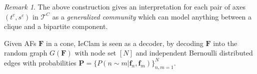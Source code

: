 \documentclass{article}
\theoremstyle{plain}
\theoremstyle{definition}
\theoremstyle{remark}
\newtheorem{remark}[theorem]{Remark}
\begin{document}
\begin{remark}
    The above construction gives an interpretation for each pair of axes $(t^c,s^c)$ in $\mathcal{T}^C$ as a \emph{generalized community} which can model anything between a clique and a bipartite component.
\end{remark}


Given AFs $\mathbf{F}$ in a cone, IeClam is seen as a decoder, by decoding $\mathbf{F}$ into the random graph $G(\mathbf{F})$ with node set $[N]$ and independent Bernoulli distributed edges with probabilities $\mathbf{P}=\{P(n\sim m|\mathbf{f}_n, \mathbf{f}_m)\}_{n,m=1}^N$.
\end{document}
